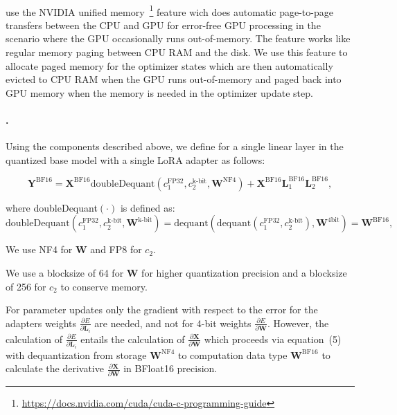 \paragraph{\Pagedoptim} use the NVIDIA unified memory~\footnote{\tiny \url{https://docs.nvidia.com/cuda/cuda-c-programming-guide}} feature wich does automatic page-to-page transfers between the CPU and GPU for error-free GPU processing in the scenario where the GPU occasionally runs out-of-memory. The feature works like regular memory paging between CPU RAM and the disk. We use this feature to allocate paged memory for the optimizer states which are then automatically evicted to CPU RAM when the GPU runs out-of-memory and paged back into GPU memory when the memory is needed in the optimizer update step.

\paragraph{\method.} Using the components described above, we define \method for a single linear layer in the quantized base model with a single LoRA adapter as follows:

\begin{equation}
    \mathbf{Y}^{\text{BF16}} =  \mathbf{X}^{\text{BF16}} \text{doubleDequant}(c_1^{\text{FP32}}, c_2^{\text{k-bit}}, \mathbf{W}^{\text{NF4}}) + \mathbf{X}^{\text{BF16}}\mathbf{L}^{\text{BF16}}_1\mathbf{L}^{\text{BF16}}_2,
\end{equation}

\noindent
where doubleDequant$(\cdot)$ is defined as:
\begin{equation}
    \text{doubleDequant}(c_1^{\text{FP32}}, c_2^{\text{k-bit}}, \mathbf{W}^{\text{k-bit}}) = \text{dequant}(\text{dequant}(c_1^{\text{FP32}}, c_2^{\text{k-bit}}), \mathbf{W}^{\text{4bit}}) = \mathbf{W}^{\text{BF16}},
\end{equation}

We use NF4 for $\mathbf{W}$ and FP8 for $c_2$.

We use a blocksize of 64 for $\mathbf{W}$ for higher quantization precision and a blocksize of 256 for $c_2$ to conserve memory.

For parameter updates only the gradient with respect to the error for the adapters weights $\frac{\partial E}{\partial \mathbf{L}_i}$ are needed, and not for 4-bit weights $\frac{\partial E}{\partial \mathbf{W}}$. However, the calculation of $\frac{\partial E}{\partial \mathbf{L}_i}$ entails the calculation of $\frac{\partial \mathbf{X}}{\partial \mathbf{W}}$ which proceeds via equation~(5) with dequantization from storage $\mathbf{W}^{\text{NF4}}$ to computation data type $\mathbf{W}^{\text{BF16}}$ to calculate the derivative $\frac{\partial \mathbf{X}}{\partial \mathbf{W}}$ in BFloat16 precision.

